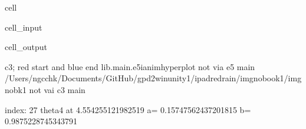 \documentclass[letterpaper,10pt,english]{jupyterBook}
\begin{document}
\begin{sphinxuseclass}{cell}\begin{sphinxVerbatimInput}

\begin{sphinxuseclass}{cell_input}
\begin{sphinxVerbatim}[commandchars=\\\{\}]
 
 
   
\end{sphinxVerbatim}

\end{sphinxuseclass}\end{sphinxVerbatimInput}
\begin{sphinxVerbatimOutput}

\begin{sphinxuseclass}{cell_output}
\begin{sphinxVerbatim}[commandchars=\\\{\}]
c3; red start and blue end
lib.main.e5\PYGZus{}i\PYGZus{}anim\PYGZus{}hyperplot
not via e5 main
/Users/ngcchk/Documents/GitHub/gpd2\PYGZhy{}win\PYGZhy{}unity1/ipadred\PYGZhy{}rain/imgno\PYGZus{}book1/imgnobk1
not vai c3 main

index: 27 
theta4 at  4.554255121982519 
 a= \PYGZhy{}0.15747562437201815  b= \PYGZhy{}0.9875228745343791 
\end{sphinxVerbatim}

\noindent{}

\end{sphinxuseclass}\end{sphinxVerbatimOutput}

\end{sphinxuseclass}
\end{document}
